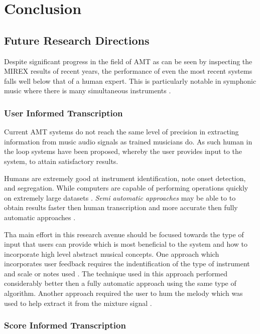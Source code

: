 \chapter{Conclusion}
\label{ch:concl}

\section{Future Research Directions}

Despite significant progress in the field of \ac{AMT} as can be seen by inspecting
the \ac{MIREX} results \cite{MIREX} of recent years, the performance of even the most
recent systems falls well below that of a human expert. This is particularly notable in symphonic
music where there is many simultaneous instruments \cite{roadmap-MIR:Serra2013}.

\subsection{User Informed Transcription}

Current \ac{AMT} systems do not reach the same level of precision in
extracting information from music audio signals as trained musicians do.
As such human in the loop systems have been proposed, whereby the user provides input to the
system, to attain satisfactory results.

Humans are extremely good at instrument identification, note onset detection,
and segregation. While computers are capable of performing operations quickly on
extremely large datasets \cite{ISMIR-tut:Benetos}. \emph{Semi automatic
    approaches} may be able to to obtain results faster then human transcription and
more accurate then fully automatic approaches \cite{ISMIR-tut:Benetos}.

Tha main effort in this research avenue should be focused towards the type of input that
users can provide which is most beneficial to the system and how to incorporate
high level abstract musical concepts. One approach which incorporates user feedback requires the indentification of
the type of instrument and scale or notes used \cite{user-inform:Kirchoff2012}.
The technique used in this approach performed considerably better then a fully
automatic approach using the same type of algorithm. Another approach required
the user to hum the melody which was used to help extract it from the mixture
signal \cite{humming2009:Smaragdis}.

\subsection{Score Informed Transcription}

